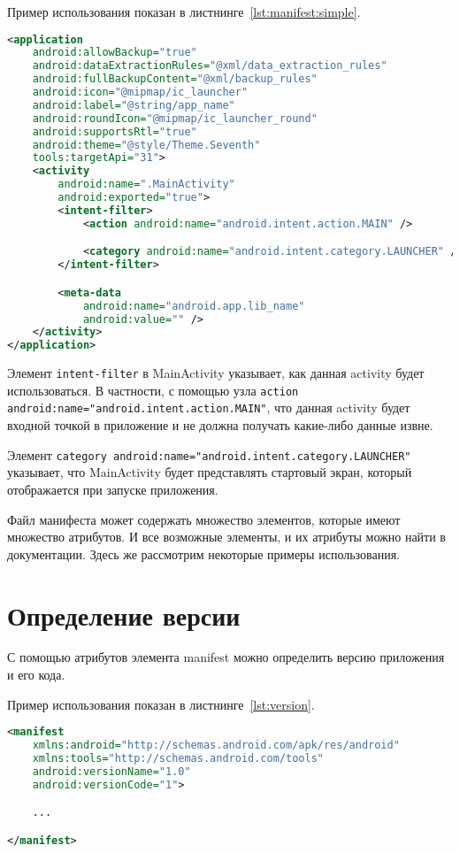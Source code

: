 Пример использования показан в листнинге~\ref{lst:manifest:simple}.
\begin{lstlisting}[language=xml, caption=\leftline{}, label=lst:manifest:simple]
<application
	android:allowBackup="true"
	android:dataExtractionRules="@xml/data_extraction_rules"
	android:fullBackupContent="@xml/backup_rules"
	android:icon="@mipmap/ic_launcher"
	android:label="@string/app_name"
	android:roundIcon="@mipmap/ic_launcher_round"
	android:supportsRtl="true"
	android:theme="@style/Theme.Seventh"
	tools:targetApi="31">
	<activity
		android:name=".MainActivity"
		android:exported="true">
		<intent-filter>
			<action android:name="android.intent.action.MAIN" />

			<category android:name="android.intent.category.LAUNCHER" />
		</intent-filter>

		<meta-data
			android:name="android.app.lib_name"
			android:value="" />
	</activity>
</application>
\end{lstlisting}

Элемент \texttt{intent-filter} в MainActivity указывает,
как данная activity будет использоваться. В частности, с помощью узла
\texttt{action android:name="android.intent.action.MAIN"},
что данная activity будет
входной точкой в приложение и не должна получать какие-либо данные извне.\par
Элемент \texttt{category android:name="android.intent.category.LAUNCHER"}
указывает, что MainActivity будет представлять стартовый экран, который
отображается при запуске приложения.\par
Файл манифеста может содержать множество элементов, которые имеют
множество атрибутов. И все возможные элементы, и их атрибуты можно
найти в документации. Здесь же рассмотрим некоторые примеры
использования.

\section{Определение версии}
С помощью атрибутов элемента manifest можно определить версию
приложения и его кода.\par
Пример использования показан в листнинге~\ref{lst:version}.

\begin{lstlisting}[language=XML
	, caption=\leftline{}
	, label=lst:version
	]
<manifest
    xmlns:android="http://schemas.android.com/apk/res/android"
    xmlns:tools="http://schemas.android.com/tools"
    android:versionName="1.0"
    android:versionCode="1">

	...

</manifest>
\end{lstlisting}

